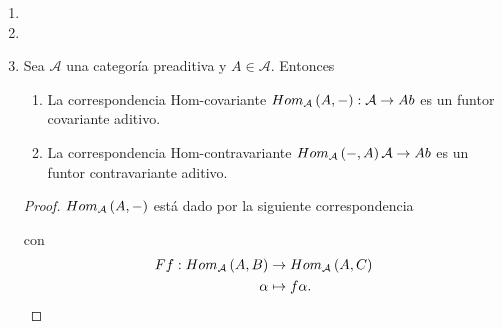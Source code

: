 \documentclass{article}
\begin{document}
\begin{enumerate}[label=\textbf{Ej \arabic*.}]
\begin{proof}
				Sean $f:A\to B,g:A\to B', h:A\to C\in Obj\lrprth{Mod\lrprth{R}\setminus C}$ tales que $f\sim g$ y $g\sim h$, por lo tanto $\exists\ p\in\ringmodhom{R}{B}{B'}$, $q\in\ringmodhom{R}{B'}{B}$, $p'\in\ringmodhom{R}{B'}{C}$, $q'\in\ringmodhom{R}{C}{B'}$ tales que
			\begin{equation*}
				\begin{split}
					pf&=g\\
					qg&=f,
				\end{split}
			\end{equation*}
			\begin{equation*}
				\begin{split}
					p'g&=h\\
					q'h&=g.
				\end{split}
			\end{equation*}
			Así $p'p\in\ringmodhom{R}{B}{C}$, $qq'\in\ringmodhom{R}{C}{B}$ y
			\begin{equation*}
				\begin{split}
					\lrprth{p'p}f&=h\\
					\lrprth{qq'}h&=f,\\			
					\therefore\ f&\sim h.
				\end{split}
			\end{equation*}
		\end{proof}
		\item 
		\item
		\item Sea $\mathcal{A}$ una categoría preaditiva y $A\in\mathcal{A}$. Entonces
		\begin{enumerate}
			\item La correspondencia Hom-covariante $Hom_\mathcal{A}\left(A,-\right):\mathcal{A}\to Ab$ es un funtor covariante aditivo.
			\item La correspondencia Hom-contravariante $Hom_\mathcal{A}\left(-,A\right)\mathcal{A}\to Ab$ es un funtor contravariante aditivo.
		\end{enumerate}
		\begin{proof}
			 $Hom_\mathcal{A}\left(A,-\right)$ está dado por la siguiente correspondencia
				\begin{center}
				\end{center}
			con 
			\begin{align*}
				\descapp{Ff}{\ringmodhom{\mathcal{A}}{A}{B}}{\ringmodhom{\mathcal{A}}{A}{C}}{\alpha}{f\alpha}{.}

\end{align*}
\end{proof}
\end{enumerate}
\end{document}
